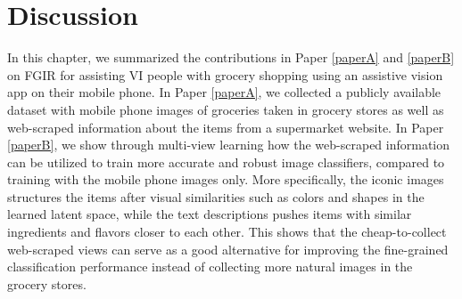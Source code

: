 







\section{Discussion}\label{chap3:sec:discussion}

In this chapter, we summarized the contributions in Paper \ref{paperA} and \ref{paperB} on FGIR for assisting VI people with grocery shopping using an assistive vision app on their mobile phone. In Paper \ref{paperA}, we collected a publicly available dataset with mobile phone images of groceries taken in grocery stores as well as web-scraped information about the items from a supermarket website. In Paper \ref{paperB}, we show through multi-view learning how the web-scraped information can be utilized to train more accurate and robust image classifiers, compared to training with the mobile phone images only. %
More specifically, the iconic images structures the items after visual similarities such as colors and shapes in the learned latent space, while the text descriptions pushes items with similar ingredients and flavors closer to each other.
This shows that the cheap-to-collect web-scraped views can serve as a good alternative for improving the fine-grained classification performance instead of collecting more natural images in the grocery stores. 

